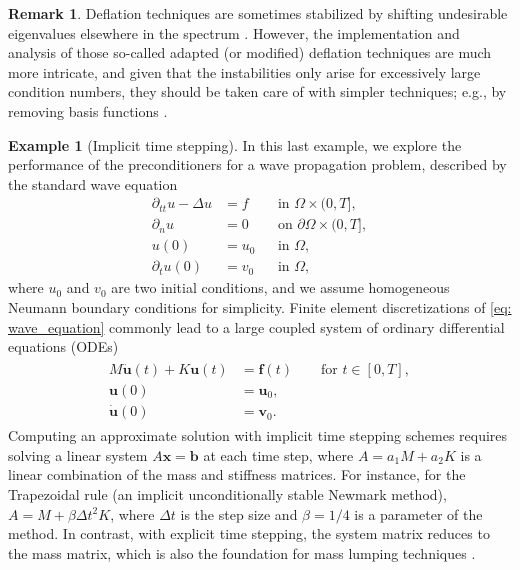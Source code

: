 \documentclass{article}
\numberwithin{equation}{section}
\theoremstyle{definition}
\newtheorem{remark}[definition]{Remark}
\newtheorem{example}[definition]{Example}
\begin{document}
\begin{remark}
Deflation techniques are sometimes stabilized by shifting undesirable eigenvalues elsewhere in the spectrum \cite{tang2009comparison,dwarka2022scalable}. However, the implementation and analysis of those so-called adapted (or modified) deflation techniques are much more intricate, and given that the instabilities only arise for excessively large condition numbers, they should be taken care of with simpler techniques; e.g., by removing basis functions \cite{elfverson2018cutiga,verhoosel2015image}.
\end{remark}

\begin{example}[Implicit time stepping]
\label{ex: implicit_time_stepping}
In this last example, we explore the performance of the preconditioners for a wave propagation problem, described by the standard wave equation
\begin{align}
\partial_{tt} u - \Delta u &=f & &\text{in } \Omega \times (0,T], \label{eq: wave_equation} \\
 \partial_n u &=0 & &\text{on } \partial \Omega \times (0,T], \nonumber \\
 u(0)&=u_0 & &\text{in } \Omega,  \nonumber \\
 \partial_t u(0)&=v_0 & &\text{in } \Omega, \nonumber
\end{align}
where $u_0$ and $v_0$ are two initial conditions, and we assume homogeneous Neumann boundary conditions for simplicity. Finite element discretizations of \eqref{eq: wave_equation} commonly lead to a large coupled system of ordinary differential equations (ODEs) \cite{hughes2012finite,quarteroni2009numerical}
\begin{align}
\label{eq: semi_discrete_pb}
\begin{split}
M\ddot{\bm{u}}(t) + K\bm{u}(t) &= \bm{f}(t) \qquad \text{for } t \in [0,T], \\
\bm{u}(0) &= \bm{u}_0,\\
\dot{\bm{u}}(0) &= \bm{v}_0.
\end{split}
\end{align} 
Computing an approximate solution with implicit time stepping schemes requires solving a linear system $A\bm{x}=\bm{b}$ at each time step, where $A = a_1M + a_2K$ is a linear combination of the mass and stiffness matrices. For instance, for the Trapezoidal rule (an implicit unconditionally stable Newmark method), $A=M+\beta \Delta t^2 K$, where $\Delta t$ is the step size and $\beta=1/4$ is a parameter of the method. In contrast, with explicit time stepping, the system matrix reduces to the mass matrix, which is also the foundation for mass lumping techniques \cite{voet2023mathematical,stoter2023critical}.


\end{example}
\end{document}
